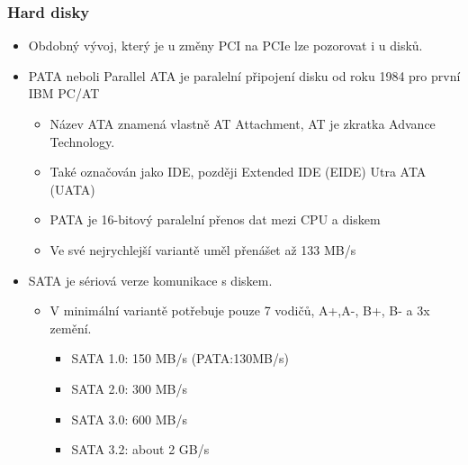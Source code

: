 \documentclass{beamer}
\begin{document}
\begin{frame}
\frametitle{Hard disky}

\begin{itemize}
\item Obdobný vývoj, který je u změny PCI na PCIe lze pozorovat i u disků.
\item PATA neboli Parallel ATA je paralelní připojení disku od roku 1984 pro první IBM PC/AT
\begin{itemize}
\item Název ATA znamená vlastně AT Attachment, AT je zkratka Advance Technology.
\item Také označován jako IDE, později Extended IDE (EIDE) Utra ATA (UATA) 
\item PATA je 16-bitový paralelní přenos dat mezi CPU a diskem
\item Ve své nejrychlejší variantě uměl přenášet až 133 MB/s 
\end{itemize}
\item SATA je sériová verze komunikace s diskem.
\begin{itemize}
\item V minimální variantě potřebuje pouze 7 vodičů, A+,A-, B+, B- a 3x zemění.
\begin{itemize}
\item SATA 1.0: 150 MB/s  (PATA:130MB/s)
\item SATA 2.0: 300 MB/s
\item SATA 3.0: 600 MB/s
\item SATA 3.2: about 2 GB/s
\end{itemize}
\end{itemize}
\end{itemize}
\end{frame}
\end{document}
